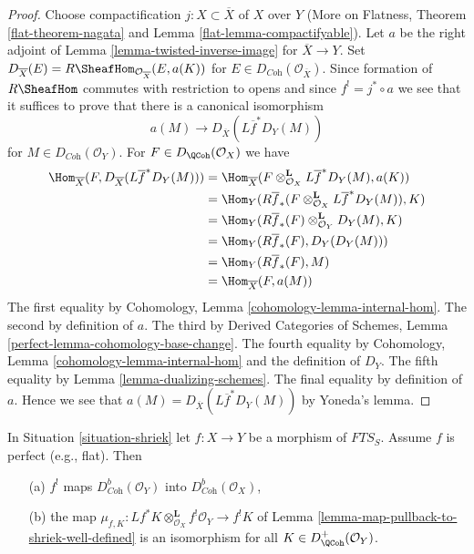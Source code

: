 \begin{proof}
Choose compactification $j : X \subset \overline{X}$ of $X$ over $Y$
(More on Flatness, Theorem \ref{flat-theorem-nagata} and
Lemma \ref{flat-lemma-compactifyable}). Let $a$ be the
right adjoint of Lemma \ref{lemma-twisted-inverse-image} for
$\overline{X} \to Y$. Set
$D_{\overline{X}}(E) = R\SheafHom_{\mathcal{O}_{\overline{X}}}(E, a(K))$
for $E \in D_{\textit{Coh}}(\mathcal{O}_{\overline{X}})$.
Since formation of $R\SheafHom$ commutes with restriction to opens
and since $f^! = j^* \circ a$ we see that it suffices to prove that
there is a canonical isomorphism
$$
a(M) \longrightarrow D_{\overline{X}}(L\overline{f}^*D_Y(M))
$$
for $M \in D_{\textit{Coh}}(\mathcal{O}_Y)$. For
$F \in D_\QCoh(\mathcal{O}_X)$ we have
\begin{align*}
\Hom_{\overline{X}}(
F, D_{\overline{X}}(L\overline{f}^*D_Y(M)))
& =
\Hom_{\overline{X}}(
F \otimes_{\mathcal{O}_X}^\mathbf{L} L\overline{f}^*D_Y(M), a(K)) \\
& =
\Hom_Y(
R\overline{f}_*(F \otimes_{\mathcal{O}_X}^\mathbf{L} L\overline{f}^*D_Y(M)),
K) \\
& =
\Hom_Y(
R\overline{f}_*(F) \otimes_{\mathcal{O}_Y}^\mathbf{L} D_Y(M),
K) \\
& =
\Hom_Y(
R\overline{f}_*(F), D_Y(D_Y(M))) \\
& =
\Hom_Y(R\overline{f}_*(F), M) \\
& = \Hom_{\overline{X}}(F, a(M))
\end{align*}
The first equality by Cohomology, Lemma \ref{cohomology-lemma-internal-hom}.
The second by definition of $a$.
The third by Derived Categories of Schemes, Lemma
\ref{perfect-lemma-cohomology-base-change}.
The fourth equality by Cohomology, Lemma \ref{cohomology-lemma-internal-hom}
and the definition of $D_Y$.
The fifth equality by Lemma \ref{lemma-dualizing-schemes}.
The final equality by definition of $a$.
Hence we see that $a(M) = D_{\overline{X}}(L\overline{f}^*D_Y(M))$
by Yoneda's lemma.
\end{proof}

\begin{lemma}
\label{lemma-perfect-comparison-shriek}
In Situation \ref{situation-shriek} let $f : X \to Y$ be a morphism of
$\textit{FTS}_S$. Assume $f$ is perfect (e.g., flat). Then
\begin{enumerate}
\item[(a)] $f^!$ maps $D_{\textit{Coh}}^b(\mathcal{O}_Y)$ into
$D_{\textit{Coh}}^b(\mathcal{O}_X)$,
\item[(b)] the map
$\mu_{f,  K} :
Lf^*K \otimes_{\mathcal{O}_X}^\mathbf{L} f^!\mathcal{O}_Y
\to
f^!K$
of Lemma \ref{lemma-map-pullback-to-shriek-well-defined}
is an isomorphism for all $K \in D_\QCoh^+(\mathcal{O}_Y)$.
\end{enumerate}
\end{lemma}

